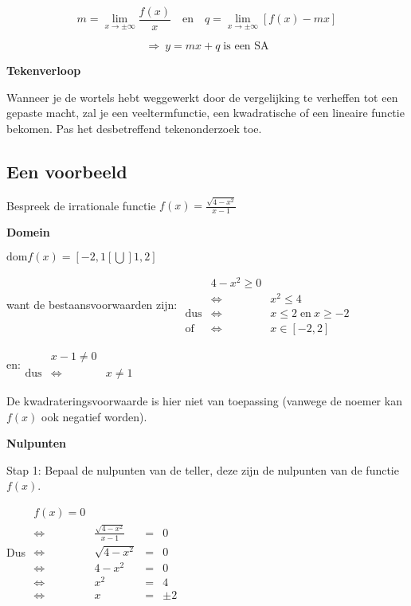 \[
{\displaystyle m={\displaystyle \lim_{x\to\pm\infty}}\frac{f(x)}{x}\quad\textrm{en}\quad q={\displaystyle \lim_{x\to\pm\infty}}\left[f(x)-mx\right]}
\]


\[
{\displaystyle \Rightarrow\:y=mx+q\;\textrm{is een SA}}
\]
\medskip{}


\noindent \textbf{Tekenverloop}

Wanneer je de wortels hebt weggewerkt door de vergelijking te verheffen
tot een gepaste macht, zal je een veeltermfunctie, een kwadratische
of een lineaire functie bekomen. Pas het desbetreffend tekenonderzoek
toe.


\subsection{Een voorbeeld}

Bespreek de irrationale functie ${\displaystyle f(x)=\frac{\sqrt{4-x^{2}}}{x-1}}$

\textbf{Domein}

${\displaystyle \textrm{dom}f(x)=[-2,1[\bigcup]1,2]}$

want de bestaansvoorwaarden zijn: ${\displaystyle \begin{array}{cclcc}
 & 4-x^{2}\geq0\\
 & \Longleftrightarrow & x^{2}\leq4\\
\textrm{dus} & \Longleftrightarrow & x\leq2\;\textrm{en}\:x\geq-2\\
\textrm{of} & \Longleftrightarrow & x\in[-2,2]
\end{array}}$

en:${\displaystyle \begin{array}{cclcc}
 & x-1\neq0\\
\textrm{dus} & \Longleftrightarrow & x\neq1
\end{array}}$

De kwadrateringsvoorwaarde is hier niet van toepassing (vanwege de
noemer kan $f(x)$ ook negatief worden).

\medskip{}


\textbf{Nulpunten}

Stap 1: Bepaal de nulpunten van de teller, deze zijn de nulpunten
van de functie $f(x)$.

Dus ${\displaystyle \begin{array}{ccclc}
f(x)=0\\
\Longleftrightarrow & \frac{\sqrt{4-x^{2}}}{x-1} & = & 0\\
\Longleftrightarrow & \sqrt{4-x^{2}} & = & 0\\
\Longleftrightarrow & 4-x^{2} & = & 0\\
\Longleftrightarrow & x^{2} & = & 4\\
\Longleftrightarrow & x & = & \pm2
\end{array}}$

